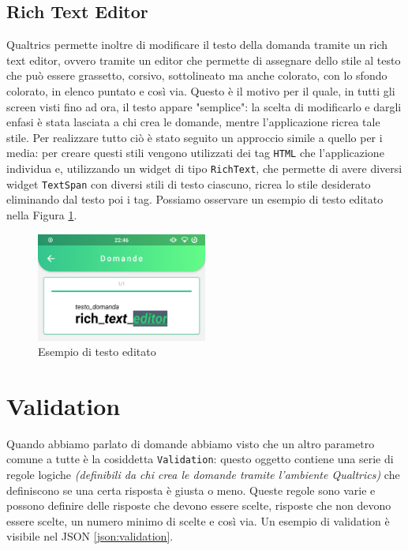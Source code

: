 \subsection{Rich Text Editor}
Qualtrics permette inoltre di modificare il testo della domanda tramite un rich text editor, ovvero tramite un editor che permette di assegnare dello stile al testo che può essere grassetto, corsivo, sottolineato ma anche colorato, con lo sfondo colorato, in elenco puntato e così via. Questo è il motivo per il quale, in tutti gli screen visti fino ad ora, il testo appare "semplice": la scelta di modificarlo e dargli enfasi è stata lasciata a chi crea le domande, mentre l'applicazione ricrea tale stile.
Per realizzare tutto ciò è stato seguito un approccio simile a quello per i media: per creare questi stili vengono utilizzati dei tag \texttt{HTML} che l'applicazione individua e, utilizzando un widget di tipo \texttt{RichText}, che permette di avere diversi widget \texttt{TextSpan} con diversi stili di testo ciascuno, ricrea lo stile desiderato eliminando dal testo poi i tag. Possiamo osservare un esempio di testo editato nella Figura \ref{fig:rich_text}.

\begin{figure}[h!]
\centering
\includegraphics[width=0.5\textwidth]{img/rich_text}
\caption{Esempio di testo editato}
\label{fig:rich_text}
\end{figure}

\section{Validation}
Quando abbiamo parlato di domande abbiamo visto che un altro parametro comune a tutte è la cosiddetta \texttt{Validation}: questo oggetto contiene una serie di regole logiche \textit{(definibili da chi crea le domande tramite l'ambiente Qualtrics)} che definiscono se una certa risposta è giusta o meno. Queste regole sono varie e possono definire delle risposte che devono essere scelte, risposte che non devono essere scelte, un numero minimo di scelte e così via. Un esempio di validation è visibile nel JSON \ref{json:validation}.

